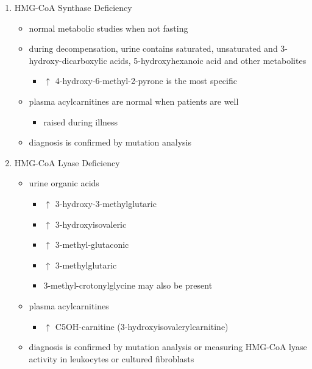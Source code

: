\documentclass{scrartcl}
\begin{document}
\begin{enumerate}
\begin{enumerate}
\item HMG-CoA Synthase Deficiency
\label{sec:orgc93dfee}
\begin{itemize}
\item normal metabolic studies when not fasting
\item during decompensation, urine contains saturated, unsaturated and
3-hydroxy-dicarboxylic acids, 5-hydroxyhexanoic acid and other
metabolites
\begin{itemize}
\item \(\uparrow\) 4-hydroxy-6-methyl-2-pyrone is the most specific
\end{itemize}
\item plasma acylcarnitines are normal when patients are well
\begin{itemize}
\item raised during illness
\end{itemize}
\item diagnosis is confirmed by mutation analysis
\end{itemize}

\item HMG-CoA Lyase Deficiency
\label{sec:orgdf347f7}
\begin{itemize}
\item urine organic acids
\begin{itemize}
\item \(\uparrow\) 3-hydroxy-3-methylglutaric
\item \(\uparrow\) 3-hydroxyisovaleric
\item \(\uparrow\) 3-methyl-glutaconic
\item \(\uparrow\) 3-methylglutaric
\item 3-methyl-crotonylglycine may also be present
\end{itemize}
\item plasma acylcarnitines
\begin{itemize}
\item \(\uparrow\) C5OH-carnitine (3-hydroxyisovalerylcarnitine)
\end{itemize}
\item diagnosis is confirmed by mutation analysis or measuring HMG-CoA
lyase activity in leukocytes or cultured fibroblasts
\end{itemize}
\end{enumerate}


\end{enumerate}
\end{document}
